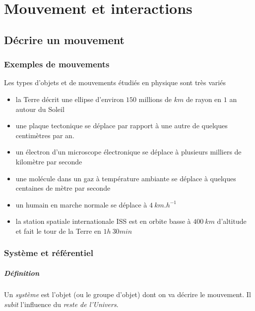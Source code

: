 
\chapter{Mouvement et interactions}

\section{Décrire un mouvement}
\subsection{Exemples de mouvements}
Les types d'objets et de mouvements étudiés en physique sont très variés
\begin{itemize}
 \item la Terre décrit une ellipse d'environ $150$ millions de $km$ de rayon en
 $1$ an autour du Soleil
 \item une plaque tectonique se déplace par rapport à une autre de quelques centimètres 
 par an.
 \item un électron d'un microscope électronique se déplace à plusieurs milliers de kilomètre
 par seconde
 \item une molécule dans un gaz à température ambiante se déplace à quelques centaines 
 de mètre par seconde
 \item un humain en marche normale se déplace à $4~km.h^{-1}$
 \item la station spatiale internationale ISS est en orbite basse à $400~km$ d'altitude et fait 
 le tour de la Terre en $1h~30min$
\end{itemize}

\subsection{Système et référentiel}
\paragraph{Définition}Un \textit{système} est l'objet (ou le groupe d'objet) dont on va décrire le mouvement. 
Il \textit{subit} l'influence du \textit{reste de l'Univers}.  
